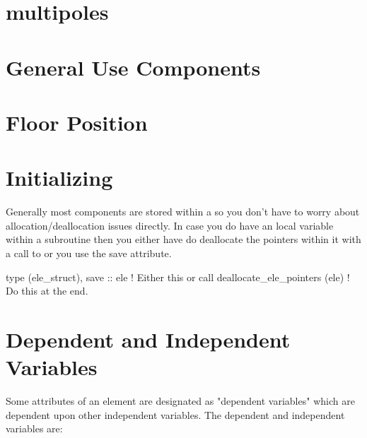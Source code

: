 {{{{{{{{\section {multipoles}

\section{General Use Components}

\section{Floor Position}

\section{Initializing}

Generally most  components are stored within a
 so you don't have to worry about
allocation/deallocation issues directly. In case you do have an local
 variable within a subroutine then you either have do
deallocate the pointers within it with a call to
 or you use the save attribute.
\begin{example}
  type (ele_struct), save :: ele     ! Either this or
  call deallocate_ele_pointers (ele) ! Do this at the end.
\end{example}


\section{Dependent and Independent Variables}

Some attributes of an element are designated as "dependent variables"
which are dependent upon other independent variables. The dependent
and independent variables are: \hfil\break
\begin{table}[h]
\end{table}

}}}}}}}}
